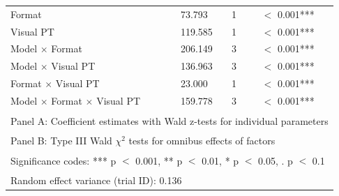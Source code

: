 \begin{table}[!h]
{\begin{tabular}[t]{lllll}
Format & 73.793 & 1 &  & $<$ 0.001***\\
Visual PT & 119.585 & 1 &  & $<$ 0.001***\\
Model $\times$ Format & 206.149 & 3 &  & $<$ 0.001***\\
Model $\times$ Visual PT & 136.963 & 3 &  & $<$ 0.001***\\
Format $\times$ Visual PT & 23.000 & 1 &  & $<$ 0.001***\\
Model $\times$ Format $\times$ Visual PT & 159.778 & 3 &  & $<$ 0.001***\\
\bottomrule
\multicolumn{5}{l}{\textsuperscript{} Panel A: Coefficient estimates with Wald z-tests for individual parameters}\\
\multicolumn{5}{l}{\textsuperscript{} Panel B: Type III Wald $\chi^2$ tests for omnibus effects of factors}\\
\multicolumn{5}{l}{\textsuperscript{} Significance codes: *** p $<$ 0.001, ** p $<$ 0.01, * p $<$ 0.05, . p $<$ 0.1}\\
\multicolumn{5}{l}{\textsuperscript{} Random effect variance (trial ID): 0.136}\\
\end{tabular}}
\end{table}
